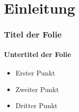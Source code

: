 \section{Einleitung}
\begin{frame}
  \frametitle{Titel der Folie}
  \framesubtitle{Untertitel der Folie}
  \begin{itemize}
    \item Erster Punkt
    \item Zweiter Punkt
    \item Dritter Punkt
  \end{itemize}
\end{frame}
